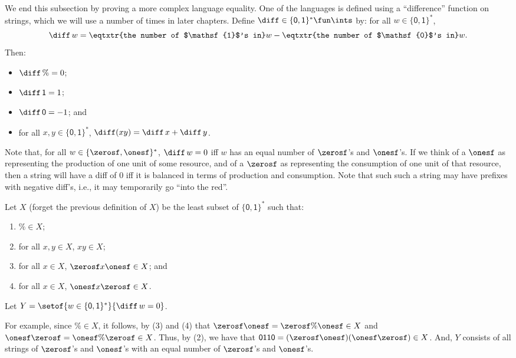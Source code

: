 We end this subsection by proving a more complex language equality.
One of the languages is defined using a ``difference'' function
%
%
on strings, which we will use a number of times in later chapters.
Define $\diff\in\{\mathsf{0,1}\}^*\fun\ints$ by:
%
%
for all $w\in\{\mathsf{0,1}\}^*$,
\begin{displaymath}
\diff\,w =
\eqtxtr{the number of $\mathsf{1}$'s in}w -
\eqtxtr{the number of $\mathsf{0}$'s in}w .
\end{displaymath}
Then:
\begin{itemize}
\item $\diff\,\% = 0$;

\item $\diff\,\mathsf{1} = 1$;

\item $\diff\,\mathsf{0} = -1$; and

\item for all $x,y\in\{\mathsf{0,1}\}^*$, $\diff(xy) = \diff\,x +
\diff\,y$.
\end{itemize}
Note that, for all $w\in\{\zerosf,\onesf\}^*$, $\diff\,w=0$
iff $w$ has an equal number of $\zerosf$'s and $\onesf$'s.
If we think of a $\onesf$ as representing the production of
one unit of some resource, and of a $\zerosf$ as representing
the consumption of one unit of that resource, then a string
will have a diff of $0$ iff it is balanced in terms of production
and consumption.  Note that such such a string may have prefixes
with negative diff's, i.e., it may temporarily go ``into the red''.

Let $X$ (forget the previous definition of $X$) be the least subset of
$\{\mathsf{0,1}\}^*$ such that:
\begin{enumerate}[\quad (1)]
\item $\%\in X$;

\item for all $x,y\in X$, $xy\in X$;

\item for all $x\in X$, $\zerosf x\onesf\in X$; and

\item for all $x\in X$, $\onesf x\zerosf\in X$.
\end{enumerate}
%
Let $Y=\setof{w\in\{\mathsf{0,1}\}^*}{\diff\,w=0}$.

For example, since $\%\in X$, it follows, by (3) and (4) that
$\zerosf\onesf=\zerosf\%\onesf\in X$ and
$\onesf\zerosf=\onesf\%\zerosf\in X$.  Thus, by (2), we have that
$\mathsf{0110}=(\zerosf\onesf)(\onesf\zerosf)\in X$.
And, $Y$ consists of all strings of $\zerosf$'s and $\onesf$'s
with an equal number of $\zerosf$'s and $\onesf$'s.

